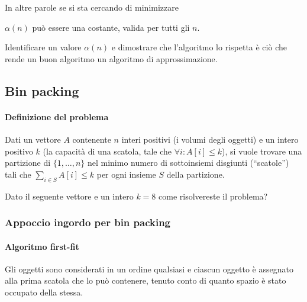 In altre parole se si sta cercando di minimizzare

\begin{observation}
\(\alpha(n)\) può essere una costante, valida per tutti gli \(n\).
\end{observation}

\begin{note}
Identificare un valore \(\alpha(n)\) e dimostrare che l'algoritmo lo rispetta è ciò che rende un buon algoritmo un algoritmo di approssimazione.
\end{note}

\subsection{Bin packing}

\paragraph{Definizione del problema}
Dati un vettore \(A\) contenente \(n\) interi positivi (i \alert{volumi} degli \alert{oggetti}) e un intero positivo \(k\) (la \alert{capacità} di una \alert{scatola}, tale che \(\forall i: A[i] \leqslant k\)), si vuole trovare una partizione di \(\{1, \dots, n\}\) nel minimo numero di sottoinsiemi disgiunti (\enquote{scatole}) tali che \(\sum_{i \in S} A[i] \leqslant k\) per ogni insieme \(S\) della partizione.

Dato il seguente vettore e un intero \(k = 8\) come risolvereste il problema?
\begin{figure}[H]
	\centering
\end{figure}

\subsubsection{Appoccio ingordo per bin packing}

\paragraph{Algoritmo first-fit}
Gli oggetti sono considerati in un ordine qualsiasi e ciascun oggetto è assegnato alla prima scatola che lo può contenere, tenuto conto di quanto spazio è stato occupato della stessa.


